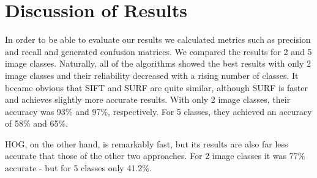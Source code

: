 \documentclass{scrartcl}
\begin{document}
\section{Discussion of Results}
In order to be able to evaluate our results we calculated metrics such as precision and recall and generated confusion matrices.
We compared the results for 2 and 5 image classes.
Naturally, all of the algorithms showed the best results with only 2 image classes and their reliability decreased with a rising number of classes.
It became obvious that SIFT and SURF are quite similar, although SURF is faster and achieves slightly more accurate results.
With only 2 image classes, their accuracy was 93\% and 97\%, respectively. For 5 classes, they achieved an accuracy of 58\% and 65\%.


HOG, on the other hand, is remarkably fast, but its results are also far less accurate that those of the other two approaches. For 2 image classes it was 77\% accurate - but for 5 classes only 41.2\%.


\end{document}
